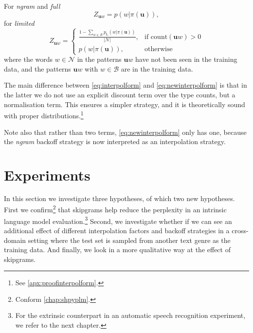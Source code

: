 For \textsl{ngram} and \textsl{full}
\begin{equation}
Z_{\mathbf{u}w} = p(w|\pi(\mathbf{u})),
\end{equation}
for \textsl{limited}
\begin{equation}
Z_{\mathbf{u}w} = \left.
\begin{cases}
\frac{1 - \sum_{w\in \mathcal{B}} p_{\mathrm{L}}(w|\pi(\mathbf{u}))}{|\mathcal{N}|}, & \text{if } \mathrm{count}(\mathbf{u}w) > 0 \\
p(w|\pi(\mathbf{u})), & \text{otherwise } 
\end{cases}
\right.
\end{equation}
where the words $w\in\mathcal{N}$ in the patterns $\mathbf{u}w$ have not been seen in the training data, and the patterns $\mathbf{u}w$ with $w\in\mathcal{B}$ are in the training data.

The main difference between \cref{eq:interpolform} and \cref{eq:newinterpolform} is that in the latter we do not use an explicit discount term over the type counts, but a normalisation term. This ensures a simpler strategy, and it is theoretically sound with proper distributions.\footnote{See \cref{apx:proofinterpolform}.} 

Note also that rather than two terms, \cref{eq:newinterpolform} only has one, because the \textsl{ngram} backoff strategy is now interpreted as an interpolation strategy.


\section{Experiments}
In this section we investigate three hypotheses, of which two new hypotheses. First we confirm\footnote{Conform \cref{chap:shpyplm}.} that skipgrams help reduce the perplexity in an intrinsic language model evaluation.\footnote{For the extrinsic counterpart in an automatic speech recognition experiment, we refer to the next chapter.} Second, we investigate whether if we can see an additional effect of different interpolation factors and backoff strategies in a cross-domain setting where the test set is sampled from another text genre as the training data. And finally, we look in a more qualitative way at the effect of skipgrams.

